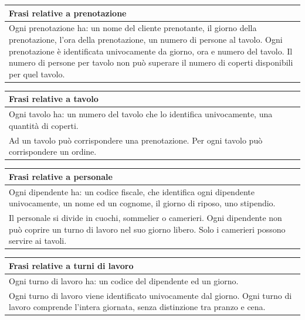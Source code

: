 \begin{longtable}{|p{15.5cm}|}
    \hline
    \textbf{Frasi relative a prenotazione} \\ \hline
    Ogni prenotazione ha: un nome del cliente prenotante, il giorno della prenotazione, l'ora della prenotazione, un numero di persone al tavolo. 
    Ogni prenotazione è identificata univocamente da giorno, ora e numero del tavolo.
    Il numero di persone per tavolo non può superare il numero di coperti disponibili per
    quel tavolo.
    \\ \hline
\end{longtable}

\begin{longtable}{|p{15.5cm}|}
    \hline
    \textbf{Frasi relative a tavolo} \\ \hline
    Ogni tavolo ha: un numero del tavolo che lo identifica univocamente, una quantità di coperti. \\
    Ad un tavolo può corrispondere una prenotazione. %
    Per ogni tavolo può corrispondere un ordine.
    \\ \hline
\end{longtable}

\begin{longtable}{|p{15.5cm}|}
    \hline
    \textbf{Frasi relative a personale} \\ \hline
    Ogni dipendente ha: un codice fiscale, che identifica ogni dipendente univocamente, un nome ed un cognome, il giorno di riposo, uno stipendio. \\
    Il personale si divide in cuochi, sommelier o camerieri.
    Ogni dipendente non può coprire un turno di lavoro nel suo giorno libero.
    Solo i camerieri possono servire ai tavoli.
    \\ \hline
\end{longtable}

\begin{longtable}{|p{15.5cm}|}
    \hline
    \textbf{Frasi relative a turni di lavoro} \\ \hline
    Ogni turno di lavoro ha: un codice del dipendente ed un giorno. \\
    Ogni turno di lavoro viene identificato univocamente dal giorno.
    Ogni turno di lavoro comprende l’intera giornata, senza distinzione tra pranzo e cena.
    \\ \hline
\end{longtable}

